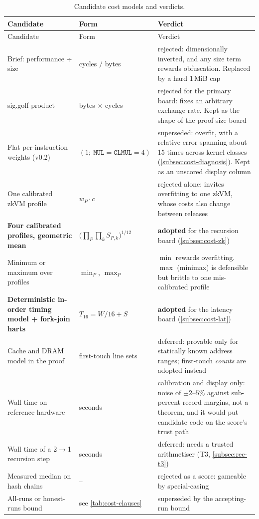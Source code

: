 \begingroup\small
\renewcommand{\arraystretch}{1.12}
\begin{longtable}{@{}>{\raggedright\arraybackslash}p{}>{\raggedright\arraybackslash}p{}>{\raggedright\arraybackslash}p{}@{}}
\caption{Candidate cost models and verdicts.}\label{tab:cost-candidates}\\
\toprule
Candidate & Form & Verdict \\
\midrule
\endfirsthead
\toprule
Candidate & Form & Verdict \\
\midrule
\endhead
Brief: performance $\div$ size & cycles $/$ bytes & rejected: dimensionally inverted, and any size term rewards obfuscation. Replaced by a hard 1\,MiB cap \\
sig.golf product & bytes $\times$ cycles & rejected for the primary board: fixes an arbitrary exchange rate. Kept as the shape of the proof-size board \\
Flat per-instruction weights (v0.2) & $(1;\ \mathtt{MUL}=\mathtt{CLMUL}=4)$ & superseded: overfit, with a relative error spanning about 15 times across kernel classes (\cref{subsec:cost-diagnosis}). Kept as an unscored display column \\
One calibrated zkVM profile & $w_P\cdot c$ & rejected alone: invites overfitting to one zkVM, whose costs also change between releases \\
\textbf{Four calibrated profiles, geometric mean} & $\bigl(\prod_P\prod_kS_{P,k}\bigr)^{1/12}$ & \textbf{adopted} for the recursion board (\cref{subsec:cost-zk}) \\
Minimum or maximum over profiles & $\min_P$, $\max_P$ & $\min$ rewards overfitting. $\max$ (minimax) is defensible but brittle to one mis-calibrated profile \\
\textbf{Deterministic in-order timing model + fork-join harts} & $T_{16}=W/16+S$ & \textbf{adopted} for the latency board (\cref{subsec:cost-lat}) \\
Cache and DRAM model in the proof & first-touch line sets & deferred: provable only for statically known address ranges; first-touch \emph{counts} are adopted instead \\
Wall time on reference hardware & seconds & calibration and display only: noise of $\pm2$--$5\%$ against sub-percent record margins, not a theorem, and it would put candidate code on the score's trust path \\
Wall time of a 2$\to$1 recursion step & seconds & deferred: needs a trusted arithmetiser (T3, \cref{subsec:rec-t3}) \\
Measured median on hash chains & -- & rejected as a score: gameable by special-casing \\
All-runs or honest-runs bound & see \cref{tab:cost-clauses} & superseded by the accepting-run bound \\
\bottomrule
\end{longtable}
\endgroup

